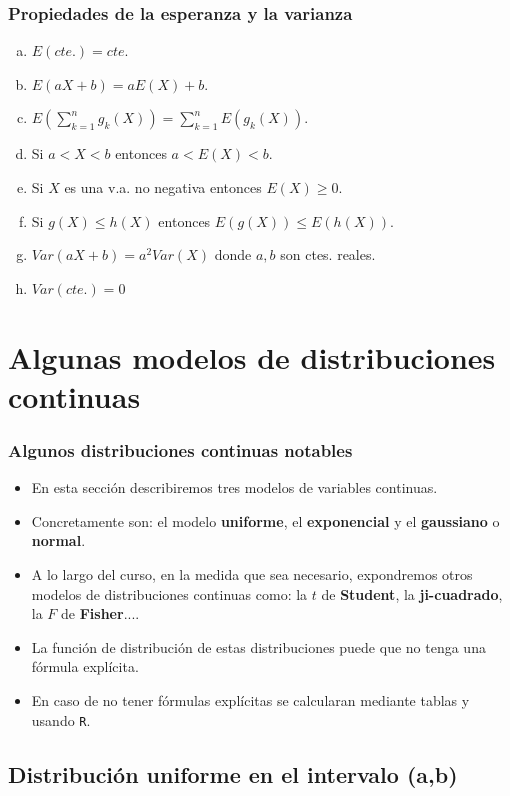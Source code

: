  \begin{frame}
\frametitle{Propiedades de la esperanza y la varianza}
\begin{enumerate}[a)]
\item $E(cte.)=cte$.
\item $E(a X+b)=a E(X)+b$.
\item $\displaystyle  E\left(\sum_{k=1}^{n }g_{k}(X)\right)=\sum_{k=1}^{n }E\left(g_{k}(X)\right)$.
\item Si $a<X<b$ entonces $a<E(X)<b$.
\item Si $X$ es una v.a. no negativa entonces $E(X)\geq 0$.
\item Si $g(X)\leq h(X)$ entonces $E(g(X))\leq E(h(X))$.
\item $Var(aX+b)=a^2 Var(X)$ donde $a,b$ son ctes. reales.
\item $Var(cte.)=0$
\end{enumerate}
\end{frame}

\section{Algunas modelos de distribuciones continuas}

\begin{frame}
\frametitle{Algunos  distribuciones continuas notables}
\begin{itemize}
\item En esta sección describiremos tres modelos de variables continuas.
\item Concretamente son: el modelo \textbf{uniforme}, el \textbf{exponencial} y el \textbf{gaussiano} o \textbf{normal}.
\item  A lo largo del curso, en la medida que sea necesario, expondremos otros modelos de distribuciones continuas como: la $t$ de \textbf{Student}, la \textbf{ji-cuadrado}, la $F$ de \textbf{Fisher}....
\item La función de distribución de estas distribuciones puede que no tenga una fórmula explícita.
\item En caso de no tener fórmulas explícitas se calcularan mediante tablas y usando \texttt{R}.
\end{itemize}
\end{frame}

\subsection{Distribución uniforme en el intervalo (a,b)}

